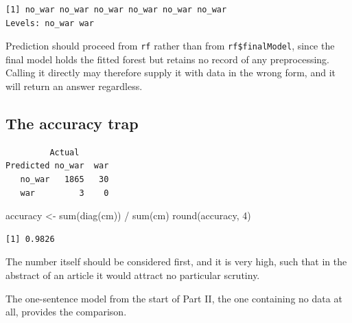 \documentclass[
  a4paper,
]{scrbook}
\newenvironment{Shaded}{\begin{snugshade}}{\end{snugshade}}
\newcommand{\AttributeTok}[1]{\textcolor[rgb]{0.40,0.45,0.13}{#1}}
\newcommand{\DecValTok}[1]{\textcolor[rgb]{0.68,0.00,0.00}{#1}}
\newcommand{\FunctionTok}[1]{\textcolor[rgb]{0.28,0.35,0.67}{#1}}
\newcommand{\NormalTok}[1]{\textcolor[rgb]{0.00,0.23,0.31}{#1}}
\newcommand{\OtherTok}[1]{\textcolor[rgb]{0.00,0.23,0.31}{#1}}
\newcommand{\SpecialCharTok}[1]{\textcolor[rgb]{0.37,0.37,0.37}{#1}}
\newcommand{\StringTok}[1]{\textcolor[rgb]{0.13,0.47,0.30}{#1}}
\begin{document}
\begin{verbatim}
[1] no_war no_war no_war no_war no_war no_war
Levels: no_war war
\end{verbatim}

Prediction should proceed from \texttt{rf} rather than from
\texttt{rf\$finalModel}, since the final model holds the fitted forest
but retains no record of any preprocessing. Calling it directly may
therefore supply it with data in the wrong form, and it will return an
answer regardless.

\subsection{The accuracy trap}\label{the-accuracy-trap}

\begin{Shaded}
\end{Shaded}

\begin{verbatim}
         Actual
Predicted no_war  war
   no_war   1865   30
   war         3    0
\end{verbatim}

\begin{Shaded}
\begin{Highlighting}[]
\NormalTok{accuracy }\OtherTok{\textless{}{-}} \FunctionTok{sum}\NormalTok{(}\FunctionTok{diag}\NormalTok{(cm)) }\SpecialCharTok{/} \FunctionTok{sum}\NormalTok{(cm)}
\FunctionTok{round}\NormalTok{(accuracy, }\DecValTok{4}\NormalTok{)}
\end{Highlighting}
\end{Shaded}

\begin{verbatim}
[1] 0.9826
\end{verbatim}

The number itself should be considered first, and it is very high, such
that in the abstract of an article it would attract no particular
scrutiny.

The one-sentence model from the start of Part II, the one containing no
data at all, provides the comparison.

\begin{Shaded}
\end{Shaded}
\end{document}
